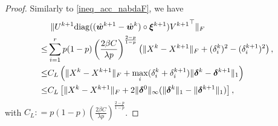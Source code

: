 \documentclass[twoside,11pt]{article}
\numberwithin{equation}{section}
\begin{document}
\begin{proof}
 Similarly to \eqref{ineq_acc_nabdaF}, we have 
 \begin{equation}\label{dec_fro_err_Left}
 \begin{aligned} 
  &\ \|   U^{k+1}{\rm diag}((\hat {\bm w}^{k+1} - \hat{ \bm{w}}^{k}) \circ\bm{\xi}^{k+1}) {V^{k+1}}^{\top}\|_F\\
                 \le & \sum\limits_{i=1}^{r}  p (1-p) \left(\frac{2\beta C}{\lambda p}\right)^{\frac{2-p}{1-p}}  \left(\| X^k-X^{k+1} \|_F +    (\delta_{i}^{k})^2 - (\delta_i^{k+1})^2 \right),\\ 
       \le & C_{L}  \left(   \| X^k-X^{k+1} \|_F   + \max\limits_{i}  (\delta_{i}^{k}+\delta_{i}^{k+1}) \|\bm{\delta}^{k}-\bm{\delta}^{k+1}\|_{1}\right) \\
       \le &  C_{L} \left[  \|X^{k}-X^{k+1}\|_{F} + 2\|\bm{\delta}^{0}\|_{\infty}  (\|\bm{\delta}^{k}\|_{1} - \|\bm{\delta}^{k+1}\|_{1}) \right] ,  
       \end{aligned} \end{equation}
   with $C_L: =      p (1-p) \left(\frac{2\beta C}{\lambda p}\right)^{\frac{2-p}{1-p}} $. 
       

\end{proof}
\end{document}
